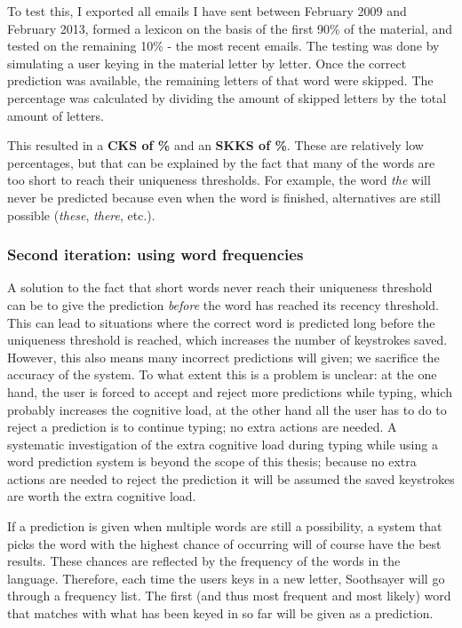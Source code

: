 \documentclass[12pt]{article}
\begin{document}
To test this, I exported all emails I have sent between February 2009 and February 2013, formed a lexicon on the basis of the first 90\% of the material, and tested on the remaining 10\% - the most recent emails. The testing was done by simulating a user keying in the material letter by letter. Once the correct prediction was available, the remaining letters of that word were skipped. The percentage was calculated by dividing the amount of skipped letters by the total amount of letters.

This resulted in a \textbf{CKS of \%} and an \textbf{SKKS of \%}. These are relatively low percentages, but that can be explained by the fact that many of the words are too short to reach their uniqueness thresholds. For example, the word \emph{the} will never be predicted because even when the word is finished, alternatives are still possible (\emph{these}, \emph{there}, etc.).


\subsubsection{Second iteration: using word frequencies}
A solution to the fact that short words never reach their uniqueness threshold can be to give the prediction \emph{before} the word has reached its recency threshold. This can lead to situations where the correct word is predicted long before the uniqueness threshold is reached, which increases the number of keystrokes saved. However, this also means many incorrect predictions will given; we sacrifice the accuracy of the system. To what extent this is a problem is unclear: at the one hand, the user is forced to accept and reject more predictions while typing, which probably increases the cognitive load, at the other hand all the user has to do to reject a prediction is to continue typing; no extra actions are needed. A systematic investigation of the extra cognitive load during typing while using a word prediction system is beyond the scope of this thesis; because no extra actions are needed to reject the prediction it will be assumed the saved keystrokes are worth the extra cognitive load.

If a prediction is given when multiple words are still a possibility, a system that picks the word with the highest chance of occurring will of course have the best results. These chances are reflected by the frequency of the words in the language. Therefore, each time the users keys in a new letter, Soothsayer will go through a frequency list. The first (and thus most frequent and most likely) word that matches with what has been keyed in so far will be given as a prediction.
\end{document}

